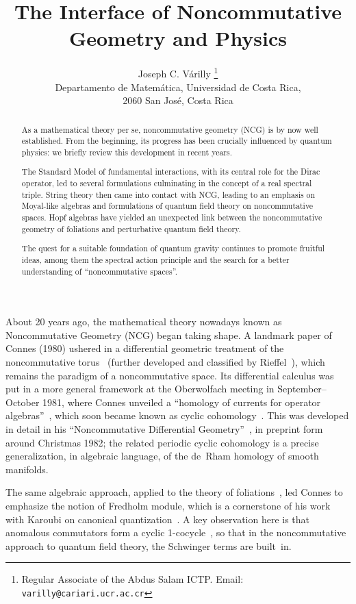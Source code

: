 \documentclass[a4paper,12pt]{article}
\title{The Interface of Noncommutative Geometry and Physics}
\author{Joseph C. V\'arilly%
  \thanks{Regular Associate of the Abdus Salam ICTP.\quad
          Email: \texttt{varilly@cariari.ucr.ac.cr}}\\[1pc]
Departamento de Matem\'atica, Universidad de Costa Rica,\\
2060 San Jos\'e, Costa Rica}
\makeatletter
\newcommand{\1}{\mathbf{1}}         %
\newcommand{\7}{\dagger}            %
\newcommand{\8}{\bullet}            %
\renewcommand{\.}{\cdot}            %
\renewcommand{\:}{\colon}           %
\def\section{\@startsection{section}{1}{\z@}{-3.5ex plus -1ex minus
 -.2ex}{2.3ex plus .2ex}{\large\bf}}
\makeatother
\begin{document}
\maketitle

\begin{abstract}
As a mathematical theory per se, noncommutative geometry (NCG) is by
now well established. From the beginning, its progress has been
crucially influenced by quantum physics: we briefly review this
development in recent years.

The Standard Model of fundamental interactions, with its central role
for the Dirac operator, led to several formulations culminating in the
concept of a real spectral triple. String theory then came into
contact with NCG, leading to an emphasis on Moyal-like algebras and
formulations of quantum field theory on noncommutative spaces. Hopf
algebras have yielded an unexpected link between the noncommutative
geometry of foliations and perturbative quantum field theory.

The quest for a suitable foundation of quantum gravity continues to
promote fruitful ideas, among them the spectral action principle and
the search for a better understanding of ``noncommutative spaces''.
\end{abstract}


\section{Introduction}

About 20 years ago, the mathematical theory nowadays known as
Noncommutative Geometry (NCG) began taking shape. A landmark paper of
Connes (1980) ushered in a differential geometric treatment of the
noncommutative torus~\cite{ConnesTorus} (further developed and
classified by Rieffel~\cite{RieffelRot}), which remains the paradigm
of a noncommutative space. Its differential calculus was put in a more
general framework at the Oberwolfach meeting in September--October
1981, where Connes unveiled a ``homology of currents for operator
algebras''~\cite{ConnesObW}, which soon became known as cyclic
cohomology~\cite{ConnesLambda}. This was developed in detail in his
``Noncommutative Differential Geometry''~\cite{ConnesNCDiffG}, in
preprint form around Christmas 1982; the related periodic cyclic
cohomology is a precise generalization, in algebraic language, of the
de~Rham homology of smooth manifolds.

The same algebraic approach, applied to the theory of
foliations~\cite{ConnesFoli}, led Connes to emphasize the notion of
Fredholm module, which is a cornerstone of his work with Karoubi on
canonical quantization~\cite{ConnesKaFred}. A key observation here is
that anomalous commutators form a cyclic 1-cocycle~\cite{ArakiSchw}, so
that in the noncommutative approach to quantum field theory, the
Schwinger terms are built~in.
\end{document}

